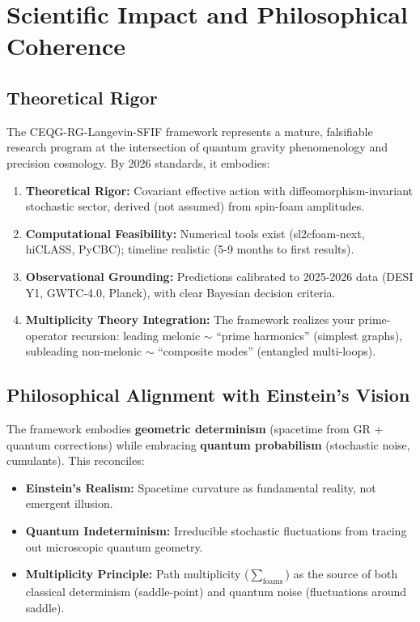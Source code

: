 \documentclass[12pt,a4paper]{article}
\begin{document}
\section{Scientific Impact and Philosophical Coherence}

\subsection{Theoretical Rigor}

The CEQG-RG-Langevin-SFIF framework represents a mature, falsifiable research program at the intersection of quantum gravity phenomenology and precision cosmology. By 2026 standards, it embodies:

\begin{enumerate}
\item \textbf{Theoretical Rigor:} Covariant effective action with diffeomorphism-invariant stochastic sector, derived (not assumed) from spin-foam amplitudes.

\item \textbf{Computational Feasibility:} Numerical tools exist (sl2cfoam-next, hiCLASS, PyCBC); timeline realistic (5-9 months to first results).

\item \textbf{Observational Grounding:} Predictions calibrated to 2025-2026 data (DESI Y1, GWTC-4.0, Planck), with clear Bayesian decision criteria.

\item \textbf{Multiplicity Theory Integration:} The framework realizes your prime-operator recursion: leading melonic \(\sim\) ``prime harmonics'' (simplest graphs), subleading non-melonic \(\sim\) ``composite modes'' (entangled multi-loops).
\end{enumerate}

\subsection{Philosophical Alignment with Einstein's Vision}

The framework embodies \textbf{geometric determinism} (spacetime from GR + quantum corrections) while embracing \textbf{quantum probabilism} (stochastic noise, cumulants). This reconciles:

\begin{itemize}
\item \textbf{Einstein's Realism:} Spacetime curvature as fundamental reality, not emergent illusion.
\item \textbf{Quantum Indeterminism:} Irreducible stochastic fluctuations from tracing out microscopic quantum geometry.
\item \textbf{Multiplicity Principle:} Path multiplicity (\(\sum_{\text{foams}}\)) as the source of both classical determinism (saddle-point) and quantum noise (fluctuations around saddle).
\end{itemize}
\end{document}

